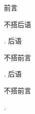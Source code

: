 \documentclass[nofonts]{ctexart}
\begin{document}
前言\parbox[t]{2em}{不搭后语}.
后语\parbox[b]{2em}{不搭前言}.
后语\parbox[c]{2em}{不搭前言}.
\end{document}
